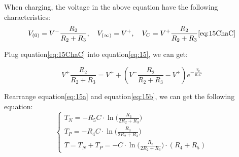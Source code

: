         When charging, the voltage in the above equation have the following characteristics:
            \begin{equation}
                V_{(0)} = V^- \frac{R_2}{R_2 + R_3}, \quad V_{(\infty)} = V^+, \quad V_C = V^+ \frac{R_2}{R_2 + R_3}
                \ref{eq:15ChaC}
            \end{equation}

        Plug equation\ref{eq:15ChaC} into equation\ref{eq:15}, we can get:

            \begin{equation}
                V^+ \frac{R_2}{R_2 + R_3} = V^+ + \left( V^- \frac{R_2}{R_2 + R_3} - V^+ \right) e^{-\frac{T_p}{R_4C}}
                \label{eq:15b}
            \end{equation}

        Rearrange equation\ref{eq:15a} and equation\ref{eq:15b}, we can get the following equation:
        \begin{equation}
            \begin{cases}
            T_N = -R_5 C \cdot \ln\big( \frac{R_3}{2R_2 + R_3} \big) \\[10pt]
            T_P = -R_4 C \cdot \ln\big(\frac{R_3}{2R_2 + R_3}\big) \\[10pt]
            T = T_N + T_P = -C \cdot \ln\big(\frac{R_3}{2R_2 + R_3}\big) \cdot (R_4 + R_5)
            \end{cases}
        \end{equation}


